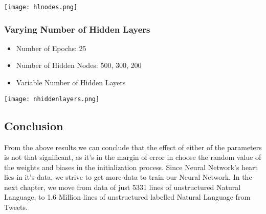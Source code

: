 \texttt{[image: hlnodes.png]}

\subsubsection{Varying Number of Hidden Layers}

\begin{itemize}
  \item Number of Epochs: 25
  \item Number of Hidden Nodes: 500, 300, 200
  \item Variable Number of Hidden Layers
\end{itemize}

\texttt{[image: nhiddenlayers.png]}

\subsection{Conclusion}
From the above results we can conclude that the effect of either of the parameters is not that significant, as it's in the margin of error in choose the random value of the weights and biases in the initialization process. Since Neural Network's heart lies in it's data, we strive to get more data to train our Neural Network. In the next chapter, we move from data  of just 5331 lines of unstructured Natural Language, to 1.6 Million lines of unstructured labelled Natural Language from Tweets.